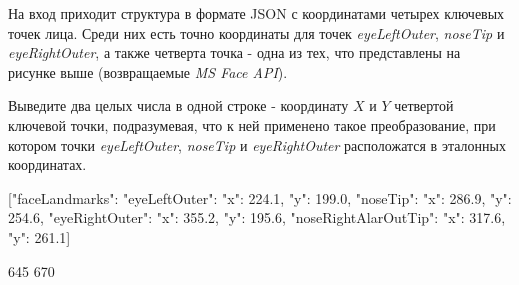 
На вход приходит структура в формате JSON с координатами четырех ключевых точек лица. Среди них есть точно координаты для точек \textit{eyeLeftOuter}, \textit{noseTip} и \textit{eyeRightOuter}, а также четверта точка - одна из тех, что представлены на рисунке выше (возвращаемые \textit{MS Face API}).

\outputfmtSection

Выведите два целых числа в одной строке - координату $X$ и $Y$ четвертой ключевой точки, подразумевая, что к ней применено такое преобразование, при котором точки \textit{eyeLeftOuter}, \textit{noseTip} и \textit{eyeRightOuter} расположатся в эталонных координатах.

\exampleSection


\begin{myverbbox}[\small]{\vinput}
[{"faceLandmarks": {"eyeLeftOuter": {"x": 224.1, "y": 199.0}, 
"noseTip": {"x": 286.9, "y": 254.6}, "eyeRightOuter": {"x": 
355.2, "y": 195.6}, "noseRightAlarOutTip": {"x": 317.6, "y": 
261.1}}}]
\end{myverbbox}
\begin{myverbbox}[\small]{\voutput}
645 670
\end{myverbbox}

